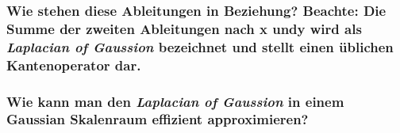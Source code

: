 \subsubsection*{Wie stehen diese Ableitungen in Beziehung? Beachte: Die Summe der zweiten Ableitungen nach x undy wird als \emph{Laplacian of Gaussion} bezeichnet und stellt einen \"ublichen Kantenoperator dar.}
\subsubsection*{Wie kann man den \emph{Laplacian of Gaussion} in einem Gaussian Skalenraum effizient approximieren?}
